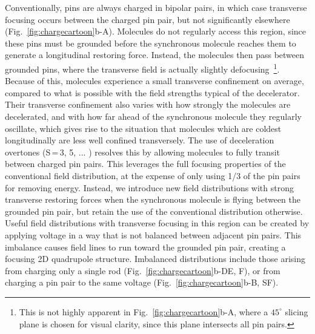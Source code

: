 \documentclass[%
 reprint,
 amsmath,amssymb,
 aps,
prl,
]{revtex4-1}
\begin{document}
Conventionally, pins are always charged in bipolar pairs, in which case transverse focusing occurs between the charged pin pair, but not significantly elsewhere (Fig.~\ref{fig:chargecartoon}b-A).
Molecules do not regularly access this region, since these pins must be grounded before the synchronous molecule reaches them to generate a longitudinal restoring force.
Instead, the molecules then pass between grounded pins, where the transverse field is actually slightly defocusing~\footnote{This is not highly apparent in Fig.~\ref{fig:chargecartoon}b-A, where a $45^\circ$ slicing plane is chosen for visual clarity, since this plane intersects all pin pairs.}.
Because of this, molecules experience a small transverse confinement on average, compared to what is possible with the field strengths typical of the decelerator. 
Their transverse confinement also varies with how strongly the molecules are decelerated, and with how far ahead of the synchronous molecule they regularly oscillate, which gives rise to the situation that molecules which are coldest longitudinally are less well confined transversely.
The use of deceleration overtones (S\,=\,3, 5, ... ) \cite{VanDeMeerakker2005a} resolves this by allowing molecules to fully transit between charged pin pairs. 
This leverages the full focusing properties of the conventional field distribution, at the expense of only using 1/3 of the pin pairs for removing energy. 
Instead, we introduce new field distributions with strong transverse restoring forces when the synchronous molecule is flying between the grounded pin pair, but retain the use of the conventional distribution otherwise.
Useful field distributions with transverse focusing in this region can be created by applying voltage in a way that is not balanced between adjacent pin pairs. 
This imbalance causes field lines to run toward the grounded pin pair, creating a focusing 2D quadrupole structure.
Imbalanced distributions include those arising from charging only a single rod (Fig.~\ref{fig:chargecartoon}b-DE, F), or from charging a pin pair to the same voltage (Fig.~\ref{fig:chargecartoon}b-B, SF).
\end{document}
